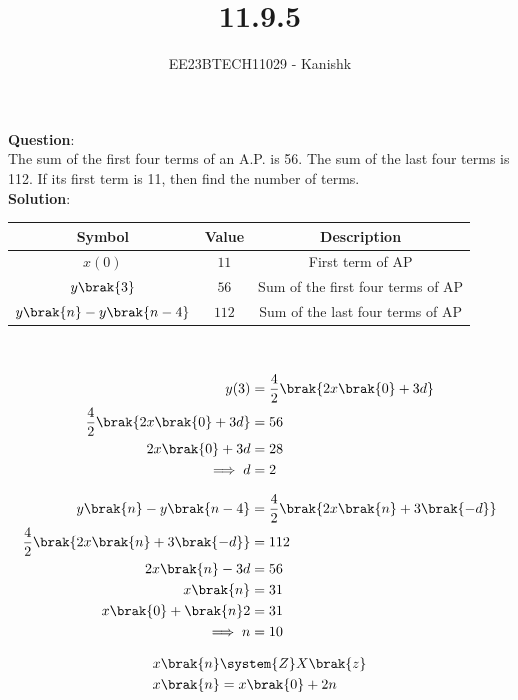 \documentclass[journal,12pt,twocolumn]{IEEEtran}
\theoremstyle{remark}
\begin{document}

\vspace{3cm}

\title{11.9.5}
\author{EE23BTECH11029 - Kanishk}
\maketitle

\bigskip



\renewcommand{\thefigure}{\theenumi}
\renewcommand{\thetable}{\theenumi}
\textbf{Question}:\\ 
The sum of the first four terms of an A.P. is 56. The sum of the last four terms is
112. If its first term is 11, then find the number of terms.\\

\textbf{Solution}:\\ 

\footnotesize
\centering
\begin{tabular}{|c|c|c|}
\hline
Symbol & Value & Description\\
\hline
$x(0)$ & $11$ & First term of AP \\
\hline
$y\brak{3}$ & $56$ & Sum of the first four terms of AP\\
\hline
$y\brak{n}-y\brak{n-4}$ & $112$& Sum of the last four terms of AP\\
\hline
\end{tabular}
\\
\small


\begin{align}
y(3)&=\frac{4}{2}\brak{2x\brak{0}+3d}\\
\frac{4}{2}\brak{2x\brak{0}+3d}&=56\\
2x\brak{0}+3d&=28\\
\implies d&=2
\end{align}

\begin{align}
y\brak{n}-y\brak{n-4}&=\frac{4}{2}\brak{2x\brak{n}+3\brak{-d}}\\
\frac{4}{2}\brak{2x\brak{n}+3\brak{-d}}&=112\\
2x\brak{n}-3d&=56\\
x\brak{n}&=31\\
x\brak{0}+\brak{n}2&=31\\
\implies n&=10
\end{align}


\begin{align}
	x \brak{n} &\system{Z} X \brak{z}\\
	x\brak{n}&=x\brak{0}+2n
\end{align}
\end{document}

